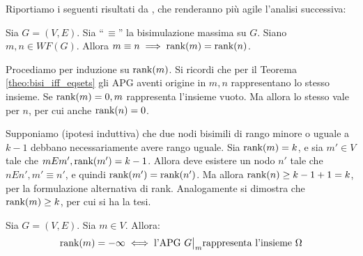 Riportiamo i seguenti risultati da \cite{dovier}, che renderanno più agile l'analisi successiva:
\begin{proposition} \label{prop:rank_bisi_imp_wf}
    Sia $G = (V,E)$. Sia ``\,$\equiv$'' la bisimulazione massima su $G$. Siano $m,n \in WF(G)$. Allora $m \equiv n \implies \textup{rank}(m) = \textup{rank}(n)$.
\end{proposition}
\begin{proof2}
    Procediamo per induzione su $\textup{rank}(m)$. Si ricordi che per il Teorema \ref{theo:bisi_iff_eqsets} gli APG aventi origine in $m,n$ rappresentano lo stesso insieme. Se $\textup{rank}(m) = 0, m$ rappresenta l'insieme vuoto. Ma allora lo stesso vale per $n$, per cui anche $\textup{rank}(n) = 0$.

    Supponiamo (ipotesi induttiva) che due nodi bisimili di rango minore o uguale a $k-1$ debbano necessariamente avere rango uguale. Sia $\textup{rank}(m) = k$, e sia $m' \in V$ tale che $m E m', \textup{rank}(m') = k-1$. Allora deve esistere un nodo $n'$ tale che $n E n', m' \equiv n'$, e quindi $\textup{rank}(m') = \textup{rank}(n')$. Ma allora $\textup{rank}(n) \geq k-1 + 1 = k$, per la formulazione alternativa di rank. Analogamente si dimostra che $\textup{rank}(m) \geq k$, per cui si ha la tesi.
\end{proof2}
\begin{proposition}
    \label{prop:omega_rank}
    Sia $G = (V,E)$. Sia $m \in V$. Allora:
    \begin{gather*}
        \rankfunc(m) = -\infty \iff \text{l'APG } \restr{G}{m} \text{rappresenta l'insieme } \Omega
    \end{gather*}
\end{proposition}
